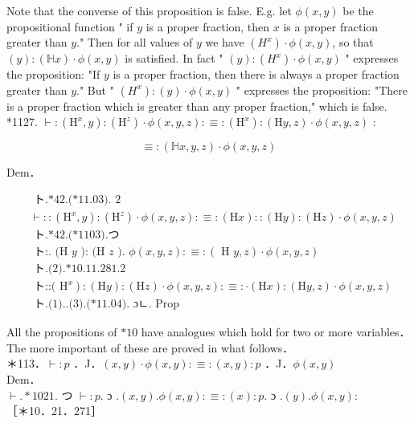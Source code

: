 \documentclass[10pt]{article}
\begin{document}
Note that the converse of this proposition is false. E.g. let $\phi(x, y)$ be the propositional function " if $y$ is a proper fraction, then $x$ is a proper fraction greater than $y$." Then for all values of $y$ we have $\left(H^{x}\right) \cdot \phi(x, y)$, so that $(y):(\mathbb{H} x) \cdot \phi(x, y)$ is satisfied. In fact " $(y):\left(H^{x}\right) \cdot \phi(x, y)$ " expresses the proposition: "If $y$ is a proper fraction, then there is always a proper fraction greater than $y$." But " $\left(H^{x}\right):(y) \cdot \phi(x, y)$ " expresses the proposition: "There is a proper fraction which is greater than any proper fraction," which is false.\\
*1127. $\vdash:\left(\mathrm{H}^{x}, y\right):\left(\mathrm{H}^{z}\right) \cdot \phi(x, y, z): \equiv:\left(\mathrm{H}^{x}\right):(\mathrm{H} y, z) \cdot \phi(x, y, z)$ :

$$
\equiv:(\mathbb{H} x, y, z) \cdot \phi(x, y, z)
$$

Dem．


\begin{align*}
& \text { ト.*42.(*11.03). } 2 \\
& \vdash::\left(\mathrm{H}^{x}, y\right):\left(\mathrm{H}^{z}\right) \cdot \phi(x, y, z): \equiv:(\mathrm{H} x)::(\mathrm{H} y):(\mathrm{H} z) \cdot \phi(x, y, z)  \tag{1}\\
& \text { ト.*42.(*1103).つ } \\
& \text { ト:. (H } y \text { ): (H } z \text { ). } \phi(x, y, z): \equiv:(\text { H } y, z) \cdot \phi(x, y, z)  \tag{2}\\
& \text { ト.(2).*10.11.281.2 } \\
& \text { ト::( } \left.\mathrm{H}^{x}\right):(\mathrm{H} y):(\mathrm{H} z) \cdot \phi(x, y, z): \equiv: \cdot(\mathrm{H} x):(\mathrm{H} y, z) \cdot \phi(x, y, z)  \tag{3}\\
& \text { ト.(1)..(3).(*11.04). ɔㄴ. Prop }
\end{align*}


All the propositions of $* 10$ have analogues which hold for two or more variables．The more important of these are proved in what follows．\\
＊113．$\vdash: p$ ．J．$(x, y) \cdot \phi(x, y): \equiv:(x, y): p$ ．J．$\phi(x, y)$\\
Dem．\\
$\vdash . * 1021$. つ $\vdash: p$. ɔ $.(x, y) . \phi(x, y): \equiv:(x): p$. ɔ $.(y) . \phi(x, y):$\\
［＊10．21．271］
\end{document}
